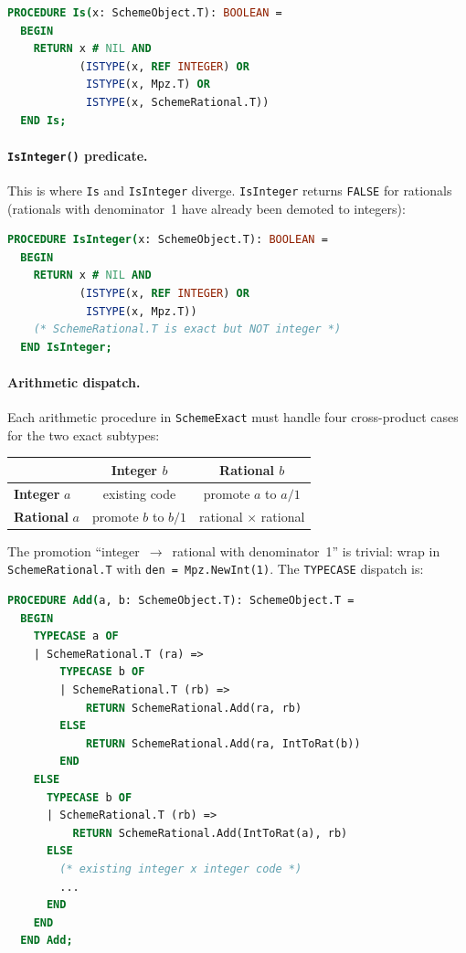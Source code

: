 \documentclass[12pt]{article}
\begin{document}
\begin{lstlisting}[language=Modula3]
PROCEDURE Is(x: SchemeObject.T): BOOLEAN =
  BEGIN
    RETURN x # NIL AND
           (ISTYPE(x, REF INTEGER) OR
            ISTYPE(x, Mpz.T) OR
            ISTYPE(x, SchemeRational.T))
  END Is;
\end{lstlisting}

\paragraph{{\tt IsInteger()} predicate.}
This is where {\tt Is} and {\tt IsInteger} diverge.
{\tt IsInteger} returns {\tt FALSE} for rationals (rationals with
denominator~1 have already been demoted to integers):

\begin{lstlisting}[language=Modula3]
PROCEDURE IsInteger(x: SchemeObject.T): BOOLEAN =
  BEGIN
    RETURN x # NIL AND
           (ISTYPE(x, REF INTEGER) OR
            ISTYPE(x, Mpz.T))
    (* SchemeRational.T is exact but NOT integer *)
  END IsInteger;
\end{lstlisting}

\paragraph{Arithmetic dispatch.}
Each arithmetic procedure in {\tt SchemeExact} must handle four
cross-product cases for the two exact subtypes:

\begin{center}
\begin{tabular}{lcc}
\toprule
& \textbf{Integer} $b$ & \textbf{Rational} $b$ \\
\midrule
\textbf{Integer} $a$ & existing code & promote $a$ to $a/1$ \\
\textbf{Rational} $a$ & promote $b$ to $b/1$ & rational $\times$ rational \\
\bottomrule
\end{tabular}
\end{center}

\noindent The promotion ``integer~$\to$~rational with denominator~1''
is trivial: wrap in {\tt SchemeRational.T} with {\tt den = Mpz.NewInt(1)}.
The {\tt TYPECASE} dispatch is:

\begin{lstlisting}[language=Modula3]
PROCEDURE Add(a, b: SchemeObject.T): SchemeObject.T =
  BEGIN
    TYPECASE a OF
    | SchemeRational.T (ra) =>
        TYPECASE b OF
        | SchemeRational.T (rb) =>
            RETURN SchemeRational.Add(ra, rb)
        ELSE
            RETURN SchemeRational.Add(ra, IntToRat(b))
        END
    ELSE
      TYPECASE b OF
      | SchemeRational.T (rb) =>
          RETURN SchemeRational.Add(IntToRat(a), rb)
      ELSE
        (* existing integer x integer code *)
        ...
      END
    END
  END Add;
\end{lstlisting}
\end{document}
